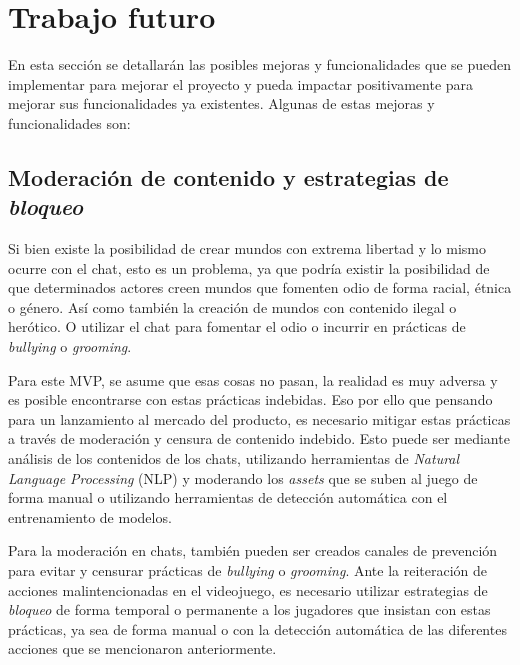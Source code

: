 \section{Trabajo futuro}

En esta sección se detallarán las posibles mejoras y funcionalidades que se pueden implementar para mejorar el proyecto y pueda impactar positivamente para mejorar
sus funcionalidades ya existentes. Algunas de estas mejoras y funcionalidades son:
\vspace{0.25cm}

\subsection{Moderación de contenido y estrategias de \textit{bloqueo}}
Si bien existe la posibilidad de crear mundos con extrema libertad y lo mismo ocurre con el chat, esto es un problema, 
ya que podría existir la posibilidad de que determinados actores creen mundos que fomenten odio de forma racial,
 étnica o género. Así como también la creación de mundos con contenido ilegal o herótico. 
 O utilizar el chat para fomentar el odio o incurrir en prácticas de \textit{bullying} o \textit{grooming}.

\vspace{0.25cm}

Para este MVP, se asume que esas cosas no pasan, la realidad es muy adversa y es posible encontrarse con estas prácticas
indebidas. Eso por ello que pensando para un lanzamiento al mercado del producto, es necesario mitigar estas
prácticas a través de moderación y censura de contenido indebido. Esto puede ser mediante análisis de los contenidos de 
los chats, utilizando herramientas de \textit{Natural Language Processing} (NLP) y moderando los \textit{assets} que se 
suben al juego de forma manual o utilizando herramientas de detección automática con el entrenamiento de modelos.

\vspace{0.25cm}

Para la moderación en chats, también pueden ser creados canales de prevención para evitar y censurar prácticas de 
\textit{bullying} o \textit{grooming}. Ante la reiteración de acciones malintencionadas en el videojuego, es necesario utilizar 
estrategias de \textit{bloqueo} de forma temporal o permanente a los jugadores que insistan con estas prácticas, ya sea 
de forma manual o con la detección automática de las diferentes acciones que se mencionaron anteriormente.


